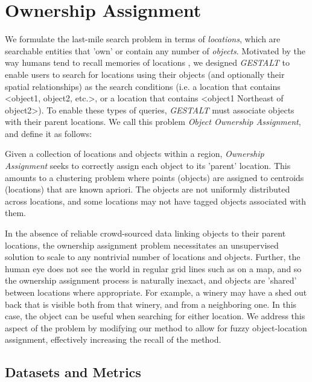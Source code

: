 \section{Ownership Assignment}
\label{section:ownership}


We formulate the last-mile search problem in terms of \textit{locations}, which are searchable entities that 'own' or contain any number of \textit{objects}. Motivated by the way humans tend to recall memories of locations , we designed \emph{GESTALT} to enable users to search for locations using their objects (and optionally their spatial relationships) as the search conditions (i.e. a location that contains <object1, object2, etc.>, or a location that contains <object1 Northeast of object2>). To enable these types of queries, \emph{GESTALT} must associate objects with their parent locations.
We call this problem \textit{Object Ownership Assignment}, and define it as follows:

Given a collection of locations and objects within a region, \emph{Ownership Assignment} seeks to correctly assign each object to its 'parent' location. This amounts to a clustering problem where points (objects) are assigned to centroids (locations) that are known apriori. The objects are not uniformly distributed across locations, and some locations may not have tagged objects associated with them. 


In the absence of reliable crowd-sourced data linking objects to their parent locations, the ownership assignment problem necessitates an unsupervised solution to scale to any nontrivial number of locations and objects. Further, the human eye does not see the world in regular grid lines such as on a map, and so the ownership assignment process is naturally inexact, and objects are 'shared' between locations where appropriate. For example, a winery may have a shed out back that is visible both from that winery, and from a neighboring one. In this case, the object can be useful when searching for either location. We address this aspect of the problem by modifying our method to allow for fuzzy object-location assignment, effectively increasing the recall of the method. 


\subsection{Datasets and Metrics}

